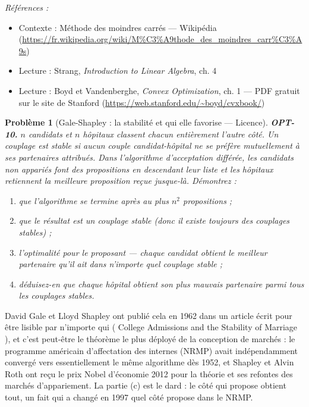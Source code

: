 \documentclass[11pt]{article}
\newtheorem{problem}{Problème}
\newenvironment{refs}{\par\small\noindent\emph{Références :}\begin{itemize}\setlength\itemsep{0pt}}{\end{itemize}\normalsize}
\begin{document}
\begin{refs}
\item Contexte : Méthode des moindres carrés --- Wikipédia (\url{https://fr.wikipedia.org/wiki/M%C3%A9thode_des_moindres_carr%C3%A9s})
\item Lecture : Strang, \textit{Introduction to Linear Algebra}, ch. 4
\item Lecture : Boyd et Vandenberghe, \textit{Convex Optimization}, ch. 1 --- PDF gratuit sur le site de Stanford (\url{https://web.stanford.edu/~boyd/cvxbook/})
\end{refs}

\bigskip

\begin{problem}[{Gale-Shapley : la stabilité et qui elle favorise --- Licence}]
\textbf{OPT-10.} $n$ candidats et $n$ hôpitaux classent chacun entièrement l'autre côté. Un couplage est \textit{stable} si aucun couple candidat-hôpital ne se préfère mutuellement à ses partenaires attribués. Dans l'algorithme d'acceptation différée, les candidats non appariés font des propositions en descendant leur liste et les hôpitaux retiennent la meilleure proposition reçue jusque-là. Démontrez :
\begin{enumerate}
\item[(a)] que l'algorithme se termine après au plus $n^2$ propositions ;
\item[(b)] que le résultat est un couplage stable (donc il existe toujours des couplages stables) ;
\item[(c)] l'optimalité pour le proposant --- chaque candidat obtient le meilleur partenaire qu'il ait dans \textit{n'importe quel} couplage stable ;
\item[(d)] déduisez-en que chaque hôpital obtient son plus mauvais partenaire parmi tous les couplages stables.
\end{enumerate}

\end{problem}

\noindent David Gale et Lloyd Shapley ont publié cela en 1962 dans un article écrit pour être lisible par n'importe qui (\og{} College Admissions and the Stability of Marriage \fg{}), et c'est peut-être le théorème le plus déployé de la conception de marchés : le programme américain d'affectation des internes (NRMP) avait indépendamment convergé vers essentiellement le même algorithme dès 1952, et Shapley et Alvin Roth ont reçu le prix Nobel d'économie 2012 pour la théorie et ses refontes des marchés d'appariement. La partie (c) est le dard : le côté qui propose obtient tout, un fait qui a changé en 1997 quel côté propose dans le NRMP.
\end{document}
